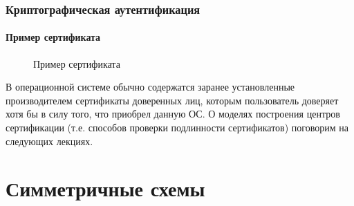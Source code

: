 \begin{frame}
    \frametitle{Криптографическая аутентификация}
    \framesubtitle{Пример сертификата}
    \begin{figure}
        \begin{center}
        \end{center}
        \caption{Пример сертификата}\label{pict:certscreen}
    \end{figure}
\end{frame}


В операционной системе обычно содержатся заранее установленные производителем сертификаты доверенных лиц, которым пользователь доверяет хотя бы в силу того, что приобрел данную ОС. О моделях построения центров сертификации (т.е. способов проверки подлинности сертификатов) поговорим на следующих лекциях.


\section{Симметричные схемы}


